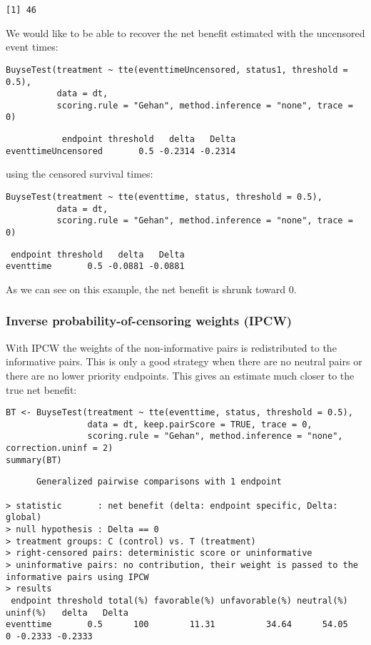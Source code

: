 \documentclass[12pt]{article}
\begin{document}
\begin{verbatim}
[1] 46
\end{verbatim}

We would like to be able to recover the net benefit estimated with the uncensored event times:
\lstset{language=r,label= ,caption= ,captionpos=b,numbers=none}
\begin{lstlisting}
BuyseTest(treatment ~ tte(eventtimeUncensored, status1, threshold = 0.5),
		  data = dt,
		  scoring.rule = "Gehan", method.inference = "none", trace = 0)
\end{lstlisting}

\begin{verbatim}
           endpoint threshold   delta   Delta
eventtimeUncensored       0.5 -0.2314 -0.2314
\end{verbatim}

using the censored survival times:
\lstset{language=r,label= ,caption= ,captionpos=b,numbers=none}
\begin{lstlisting}
BuyseTest(treatment ~ tte(eventtime, status, threshold = 0.5),
		  data = dt,
		  scoring.rule = "Gehan", method.inference = "none", trace = 0)
\end{lstlisting}

\begin{verbatim}
 endpoint threshold   delta   Delta
eventtime       0.5 -0.0881 -0.0881
\end{verbatim}

As we can see on this example, the net benefit is shrunk toward 0.

\subsubsection{Inverse probability-of-censoring weights (IPCW)}
\label{sec:org0f226e9}

With IPCW the weights of the non-informative pairs is redistributed to
the informative pairs. This is only a good strategy when there are no
neutral pairs or there are no lower priority endpoints. This gives an
estimate much closer to the true net benefit:
\lstset{language=r,label= ,caption= ,captionpos=b,numbers=none}
\begin{lstlisting}
BT <- BuyseTest(treatment ~ tte(eventtime, status, threshold = 0.5),
				data = dt, keep.pairScore = TRUE, trace = 0,
				scoring.rule = "Gehan", method.inference = "none", correction.uninf = 2)
summary(BT)
\end{lstlisting}

\begin{verbatim}
      Generalized pairwise comparisons with 1 endpoint

> statistic       : net benefit (delta: endpoint specific, Delta: global) 
> null hypothesis : Delta == 0 
> treatment groups: C (control) vs. T (treatment) 
> right-censored pairs: deterministic score or uninformative
> uninformative pairs: no contribution, their weight is passed to the informative pairs using IPCW
> results
 endpoint threshold total(%) favorable(%) unfavorable(%) neutral(%) uninf(%)   delta   Delta
eventtime       0.5      100        11.31          34.64      54.05        0 -0.2333 -0.2333
\end{verbatim}
\end{document}
